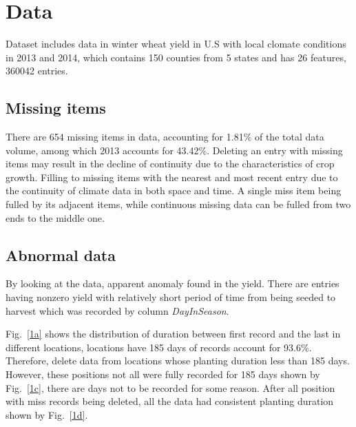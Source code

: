 \documentclass[conference]{IEEEtran}
\begin{document}
\section{Data}
Dataset includes data in winter wheat yield in U.S with local clomate conditions in 2013 and 2014, which contains 150 counties from 5 states and has 26 features, 360042 entries.

\subsection{Missing items}
There are 654 missing items in data, accounting for 1.81\% of the total data volume, among which 2013 accounts for 43.42\%. Deleting an entry with missing items may result in the decline of continuity due to the characteristics of crop growth. Filling to missing items with the nearest and most recent entry due to the continuity of climate data in both space and time. A single miss item being fulled by its adjacent items, while continuous missing data can be fulled from two ends to the middle one.

\subsection{Abnormal data}
By looking at the data, apparent anomaly found in the yield. There are entries having nonzero yield with relatively short period of time from being seeded to harvest which was recorded by column \textit{DayInSeason}. 

Fig.~\ref{1a} shows the distribution of duration between first record and the last in different locations, locations have 185 days of records account for  93.6\%. Therefore, delete data from locations whose planting duration less than 185 days. However, these positions not all were fully recorded for 185 days shown by Fig.~\ref{1c}, there are days not to be recorded for some reason. After all position with miss records being deleted, all the data had consistent planting duration shown by Fig.~\ref{1d}.
\end{document}
